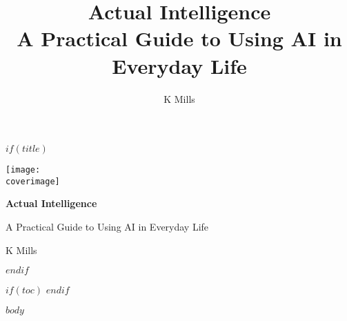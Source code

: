 \documentclass[12pt,a4paper]{book}
\title{\Huge Actual Intelligence\\\large A Practical Guide to Using AI in Everyday Life}
\author{K Mills}
\date{\builddate}
\newcommand{\coverimage}{$cover-image$}
\newcommand{\makecovertitle}{
  \begin{titlepage}
    \centering
    \texttt{[image: \\coverimage]}
  \end{titlepage}
  \newpage
  \thispagestyle{empty}
  \begin{center}
    \vspace*{2cm}
    {\Huge \textbf{Actual Intelligence}}\par
    \vspace{1cm}
    {\Large A Practical Guide to Using AI in Everyday Life}\par
    \vspace{2cm}
    {\large K Mills}\par
    \vspace{1cm}
  \end{center}
  \newpage
}
\newcommand{\makecovertitle}{
  \maketitle
}
\begin{document}
$if(title)$
\makecovertitle
$endif$

$if(toc)$
\tableofcontents
\clearpage
$endif$

$body$
\end{document}
